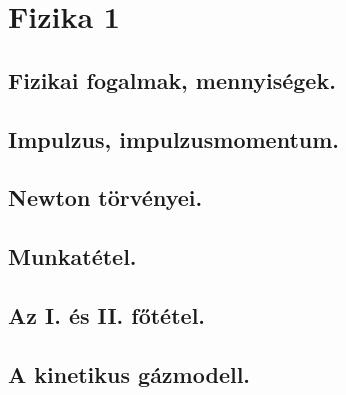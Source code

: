 \section{Fizika 1}
\subsection{Fizikai fogalmak, mennyiségek.}

\subsection{Impulzus, impulzusmomentum.}

\subsection{Newton törvényei.}

\subsection{Munkatétel.}

\subsection{Az I. és II. főtétel.}

\subsection{A kinetikus gázmodell.}
